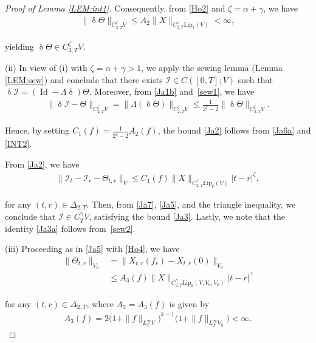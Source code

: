 \documentclass[letterpaper, 11pt,  reqno]{amsart}
\DeclareMathOperator{\Id}{Id}
\newcommand{\1}{\hspace{0.5mm}\text{I}\hspace{0.5mm}}
\newcommand{\I}{\mathcal{I}}
\newcommand{\noi}{\noindent}
\newcommand{\al}{\alpha}
\newcommand{\updl}{\updelta}
\newcommand{\Dl}{\Delta}
\newcommand{\g}{\gamma}
\newcommand{\Lip}{\mathrm{Lip}}
\newcommand{\z}{\zeta}
\numberwithin{equation}{section}
\numberwithin{theorem}{section}
\begin{document}
\begin{proof}[Proof of Lemma \ref{LEM:int1}]
\noi
Consequently, 
from \eqref{Ho2}
and $\z = \al + \g$, 
we have 
\begin{align}
\label{INT2}
\|\updl \Theta\|_{C^\z_{3,T} V}
\leq A_2
\|X\|_{C^\g_{2,T}\Lip_k(V)}
<\infty,
\end{align}


\noi
yielding 
 $\updl \Theta \in C^\z_{3,T}  V$.





\medskip

\noi
(ii)
In view of (i) with $\z = \al + \g > 1$, 
we apply the sewing lemma (Lemma \ref{LEM:sew})
and conclude that 
there exists $\I\in C([0,T]; V)$ 
such that 
$\updl \I = (\Id - \Lambda \updl)\Theta$. 
Moreover, from \eqref{Ja1b} and~\eqref{sew1}, we have 
\begin{align}
\label{Ja6a}
\| \updl \I - \Theta \|_{C^\z _{2,T} V} 
= \|   \Lambda (\updl \Theta) \|_{C^\z _{2,T} V} 
\leq \frac{1}{2^\z -2} 
\|\updl \Theta\|_{C^\z _{3,T} V}.
\end{align} 



\noi
Hence, 
by  setting $C_1(f)  = \frac{1}{2^\z -2} A_2(f)$, 
the bound \eqref{Ja2}
follows from \eqref{Ja6a}
and 
 \eqref{INT2}.

 
 
 
From 
\eqref{Ja2}, we have 
\begin{align}
\label{Ja7}
\|\I_t - \I_r - \Theta_{t,r}\|_{ V}
\leq C_1(f)
\|X\|_{C^\g_{2,T}\Lip_k(V)}|t-r|^{\z},
\end{align}

\noi
for any  $(t,r)\in \Dl_{2,T}$.
Then, from \eqref{Ja7}, \eqref{Ja5}, 
and the triangle inequality, 
we conclude that 
 $\I\in C^\g_T  V$, satisfying the bound
 \eqref{Ja3}.
Lastly, we note that 
the identity \eqref{Ja3a} follows from~\eqref{sew2}.



\medskip

\noi
(iii)
Proceeding as in \eqref{Ja5}
with \eqref{Ho4}, we have 
\begin{equation}
\begin{aligned}
\|\Theta_{t,r}\|_{V_0} 
& =\|X_{t,r}(f_r)-X_{t,r}(0)\|_{ V_0}\\
& \leq A_3(f) \|X\|_{C^\g_{2,T}\Lip_k(V, V_0; V_0)} |t-r|^\g 
\end{aligned}
\label{Jaa5}
\end{equation}


\noi
for any $(t,r)\in\Dl_{2,T}$, 
where $A_3= A_3(f)$ is given by 
\begin{align*}
A_3(f)
= 2\big(1 + \|f\|_{ L^\infty_TV}\big)^{k-1} 
\big(1 + \|f\|_{ L^\infty_T V_0} \big)
<\infty. 
\end{align*}





\end{proof}
\end{document}
